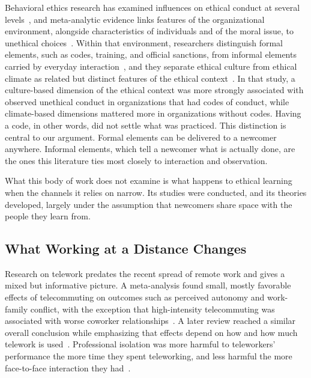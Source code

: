 \documentclass[12pt,a4paper]{article}
\theoremstyle{definition}
\begin{document}
Behavioral ethics research has examined influences on ethical conduct at several levels~\citep{trevino2006behavioral}, and meta-analytic evidence links features of the organizational environment, alongside characteristics of individuals and of the moral issue, to unethical choices~\citep{kishgephart2010bad}. Within that environment, researchers distinguish formal elements, such as codes, training, and official sanctions, from informal elements carried by everyday interaction~\citep{tenbrunsel2003building}, and they separate ethical culture from ethical climate as related but distinct features of the ethical context~\citep{trevino1998ethical}. In that study, a culture-based dimension of the ethical context was more strongly associated with observed unethical conduct in organizations that had codes of conduct, while climate-based dimensions mattered more in organizations without codes. Having a code, in other words, did not settle what was practiced. This distinction is central to our argument. Formal elements can be delivered to a newcomer anywhere. Informal elements, which tell a newcomer what is actually done, are the ones this literature ties most closely to interaction and observation.

What this body of work does not examine is what happens to ethical learning when the channels it relies on narrow. Its studies were conducted, and its theories developed, largely under the assumption that newcomers share space with the people they learn from.

\subsection{What Working at a Distance Changes}

Research on telework predates the recent spread of remote work and gives a mixed but informative picture. A meta-analysis found small, mostly favorable effects of telecommuting on outcomes such as perceived autonomy and work-family conflict, with the exception that high-intensity telecommuting was associated with worse coworker relationships~\citep{gajendran2007good}. A later review reached a similar overall conclusion while emphasizing that effects depend on how and how much telework is used~\citep{allen2015how}. Professional isolation was more harmful to teleworkers' performance the more time they spent teleworking, and less harmful the more face-to-face interaction they had~\citep{golden2008impact}.
\end{document}
